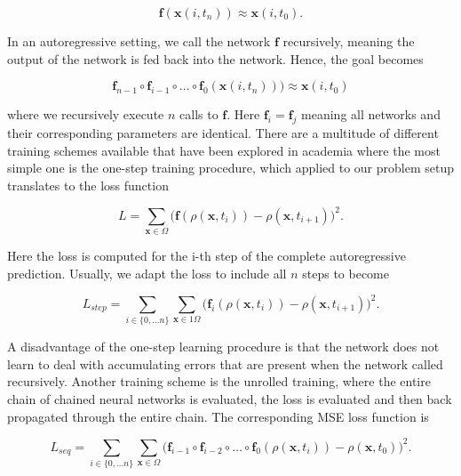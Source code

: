 \documentclass{article}
\begin{document}
\begin{equation}
\label{goal-2}
    \mathbf{f}(\mathbf{x}(i, t_{n})) \approx \mathbf{x}(i, t_{0}).
\end{equation}

In an autoregressive setting, we call the network $\mathbf{f}$ recursively, meaning the output of the network is fed back into the network. Hence, the goal becomes

\begin{equation}
\label{goal-rec}
    \mathbf{f}_{n-1} \circ \mathbf{f}_{i-1} \circ \dots \circ \mathbf{f}_0(\mathbf{x}(i, t_{n}))\bigr) \approx \mathbf{x}(i, t_{0})
\end{equation}

where we recursively execute $n$ calls to $\mathbf{f}$. Here $\mathbf{f}_i = \mathbf{f}_j$ meaning all networks and their corresponding parameters are identical. There are a multitude of different training schemes available that have been explored in academia where the most simple one is the one-step training procedure, which applied to our problem setup translates to the loss function 

\begin{equation}
    L = \sum_{\mathbf{x} \in  \Omega} \Biggl(\mathbf{f}(\rho(\mathbf{x}, t_{i})) - \rho(\mathbf{x}, t_{i+1})\Biggr)^2.
\end{equation}

Here the loss is computed for the i-th step of the complete autoregressive prediction. Usually, we adapt the loss to include all $n$ steps to become


\begin{equation}
\label{step}
    L_{step} = \sum_{i \in \{0, \dots n\}}\sum_{\mathbf{x} \in 1 \Omega} \Biggl(\mathbf{f}_i(\rho(\mathbf{x}, t_{i})) - \rho(\mathbf{x}, t_{i+1})\Biggr)^2.
\end{equation}

A disadvantage of the one-step learning procedure is that the network does not learn to deal with accumulating errors that are present when the network called recursively. Another training scheme is the unrolled training, where the entire chain of chained neural networks is evaluated, the loss is evaluated and then back propagated through the entire chain. The corresponding MSE loss function is 

\begin{equation}
\label{seq}
    L_{seq} = \sum_{i \in \{0, \dots n\}}\sum_{\mathbf{x} \in \Omega} \Biggl(\mathbf{f}_{i-1} \circ \mathbf{f}_{i-2} \circ \dots \circ \mathbf{f}_0 (\rho(\mathbf{x}, t_{i})) - \rho(\mathbf{x}, t_{0})\Biggr)^2.
\end{equation}
\end{document}

